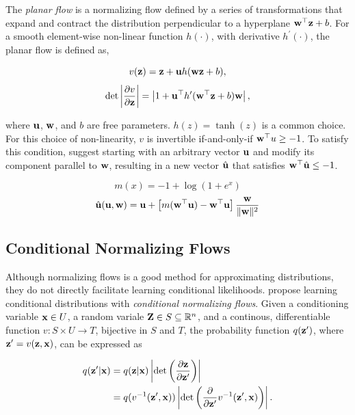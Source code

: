 \documentclass[twoside]{article}
\begin{document}
The \emph{planar flow} is a normalizing flow defined by a series of
transformations that expand and contract the distribution perpendicular to a
hyperplane \(\mathbf{w}^\top \textbf{z}  + b\). For a smooth element-wise non-linear
function \(h(\cdot)\), with derivative \(h^\prime(\cdot)\), the planar flow is
defined as,

\begin{equation}
  v(\textbf{z}) = \textbf{z} + \mathbf{u} h(\mathbf{w} \textbf{z} + b),
\end{equation}
\begin{equation}
  \det \left\lvert \frac{\partial v}{\partial \textbf{z}} \right\rvert =
  \left\lvert 1 + \mathbf{u}^\top h^\prime(\mathbf{w}^\top \textbf{z} + b) \mathbf{w} \right\rvert,
\end{equation}

\noindent
where \(\mathbf{u}\), \(\mathbf{w}\), and \(b\) are free parameters.
\(h(z) = \tanh(z)\) is a common choice. For this choice of non-linearity,
\(v\) is invertible if-and-only-if \(\mathbf{w}^\top u \geq -1\). To satisfy this
condition, \citet{rezende15} suggest starting with an arbitrary vector
\(\mathbf{u}\) and modify its component parallel to \(\mathbf{w}\), resulting in a new
vector \(\hat{\mathbf{u}}\) that satisfies \(\mathbf{w}^\top \hat{\mathbf{u}} \leq -1\).

\begin{equation*}
  m(x) = -1 + \log{(1 + e^x)}
\end{equation*}
\begin{equation}
  \hat{\mathbf{u}}(\mathbf{u}, \mathbf{w}) = \mathbf{u} + \left[m(\mathbf{w}^\top \mathbf{u}) -
  \mathbf{w}^\top \mathbf{u} \right] \frac{\mathbf{w}}{\lVert\mathbf{w}\rVert^2}
\end{equation}

\subsection{Conditional Normalizing Flows} \label{sec:cnf}
Although normalizing flows is a good method for approximating distributions,
they do not directly facilitate learning conditional likelihoods.
\citet{winkler19} propose learning conditional distributions with
\emph{conditional normalizing flows}. Given a conditioning variable
\(\textbf{x} \in U\), a random variale \(\textbf{Z} \in S \subseteq \mathbb{R}^n\), and a continous,
differentiable function \(v : S \times U \rightarrow T\), bijective in \(S\) and
\(T\), the probability function \(q(\textbf{z}^\prime)\), where
\(\textbf{z}^\prime = v(\textbf{z}, \textbf{x})\), can be expressed as

\begin{align}
  q(\textbf{z}^\prime \vert \textbf{x}) &= q(\textbf{z} \vert \textbf{x}) \left\lvert \det
  \left( \frac{\partial \textbf{z}}{\partial \textbf{z}^\prime} \right) \right\rvert
  \nonumber\\
  &= q(v^{-1}(\textbf{z}^\prime, \textbf{x})) \left\lvert \det \left( \frac{\partial}
  {\partial \textbf{z}^\prime} v^{-1}(\textbf{z}^\prime, \textbf{x}) \right) \right\rvert.
  \label{eq:cond_change_var_form1}
\end{align}
\end{document}
